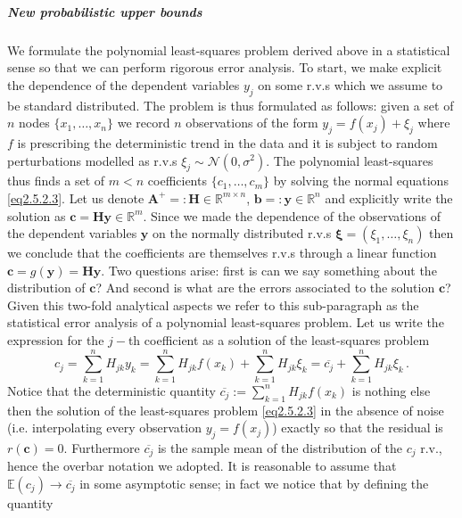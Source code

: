 \documentclass[../main.tex]{subfiles}
\begin{document}
\subparagraph{New probabilistic upper bounds}\label{subpar1.1.1.1.2}
We formulate the polynomial least-squares problem derived above in a statistical sense so that we can perform rigorous error analysis.
To start, we make explicit the dependence of the dependent variables $y_{j}$ on some r.v.s which we assume to be standard distributed.
The problem is thus formulated as follows: given a set of $n$ nodes $\{x_{1},\dots,x_{n}\}$ we record $n$ observations of the form $y_{j} = f(x_{j}) + \xi_{j}$ where $f$ is prescribing the deterministic trend in the data and it is subject to random perturbations modelled as r.v.s $\xi_{j}\sim \mathcal{N}(0,\sigma^2)$.
The polynomial least-squares thus finds a set of $m<n$ coefficients $\{c_{1},\dots,c_{m}\}$ by solving the normal equations \eqref{eq2.5.2.3}.
Let us denote $\boldsymbol{A}^{+}=:\boldsymbol{H}\in \mathbb{R}^{m\times n}$, $\boldsymbol{b}=:\boldsymbol{y}\in \mathbb{R}^{n}$ and explicitly write the solution as $\boldsymbol{c} = \boldsymbol{Hy}\in \mathbb{R}^{m}$.
Since we made the dependence of the observations of the dependent variables $\boldsymbol{y}$ on the normally distributed r.v.s $\boldsymbol{\xi}=(\xi_{1},\dots,\xi_{n})$ then we conclude that the coefficients are themselves r.v.s through a linear function $\boldsymbol{c} = g(\boldsymbol{y}) = \boldsymbol{Hy}$.
Two questions arise: first is can we say something about the distribution of $\boldsymbol{c}$? And second is what are the errors associated to the solution $\boldsymbol{c}$?
Given this two-fold analytical aspects we refer to this sub-paragraph as the statistical error analysis of a polynomial least-squares problem.
Let us write the expression for the $j-$th coefficient as a solution of the least-squares problem
\begin{equation}\label{eq2.5.2.4}
        c_{j} = \sum_{k=1}^{n}H_{jk}y_{k} = \sum_{k=1}^{n}H_{jk}f(x_{k}) + \sum_{k=1}^{n}H_{jk}\xi_{k} = \overline{c_{j}} + \sum_{k=1}^{n}H_{jk}\xi_{k}\,.
\end{equation}
Notice that the deterministic quantity $\overline{c_{j}} := \sum_{k=1}^{n}H_{jk}f(x_{k})$ is nothing else then the solution of the least-squares problem \eqref{eq2.5.2.3} in the absence of noise (i.e. interpolating every observation $y_{j} = f(x_{j})$) exactly so that the residual is $r(\boldsymbol{c}) = 0$.
Furthermore $\overline{c_{j}}$ is the sample mean of the distribution of the $c_{j}$ r.v., hence the overbar notation we adopted.
It is reasonable to assume that $\mathbb{E}(c_{j})\to\overline{c_{j}}$ in some asymptotic sense; in fact we notice that by defining the quantity
\end{document}
